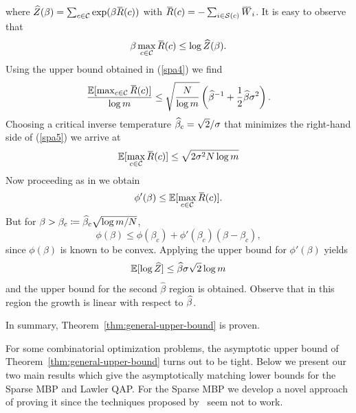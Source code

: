 where $\hat{Z}(\beta)=\sum_{c \in \C} \exp(\beta \bar{R}(c))$ with
$\bar{R}(c)=-\sum_{i \in \S(c)} \bar{W}_i$.  It is easy to observe
that
\begin{equation}
\beta \max_{c\in \C} \bar{R}(c) \leq \log \hat{Z}(\beta).
\end{equation}
Using the upper bound obtained in (\ref{spa4}) we  find
\begin{equation}
\label{spa5}
\frac{\Expct[\max_{c\in \C} \bar{R}(c)]}{\log m} \leq  \sqrt{\frac{N}{\log 
    m}} \left( {\hb}^{-1}+\frac 12 \hb \sigma^2 \right). 
\end{equation}
Choosing a critical inverse temperature $\hb_c=\sqrt{2}/\sigma$ 
that minimizes the right-hand side of (\ref{spa5}) we arrive at
\begin{equation}
  \Expct[\max_{c\in \C} \bar{R}(c)] \leq \sqrt{2\sigma^2 N \log m} 
\end{equation}
Now proceeding as in \citet[Proposition~1.1.3]{talagrand03}
we obtain
\begin{equation}
\phi'(\beta) \leq \Expct[\max_{c\in \C} \bar{R}(c)].
\end{equation}
But for $\beta > \beta_c \coloneqq \hb_c\sqrt{\log m / N}$,
\begin{equation}
    \phi(\beta)
    \leq \phi(\beta_c) + \phi'(\beta_c)(\beta - \beta_c),
\end{equation}
%
since $\phi(\beta)$ is known to be convex.  Applying the
upper bound for $\phi'(\beta)$ yields 
\begin{equation}\label{second_upper}
\Expct[\log \hat Z] \leq \hb \sigma \sqrt{2} \log m
\end{equation}
and the upper bound for the second $\hat\beta$ region is obtained.
Observe that in this region the growth is linear with respect to $\hb$. 

In summary, Theorem~\ref{thm:general-upper-bound} is proven. \QEDA


For some combinatorial optimization problems, the asymptotic upper bound of
Theorem~\ref{thm:general-upper-bound} turns out to be tight. Below we present
our two main results which give the asymptotically matching lower bounds for the
Sparse MBP and Lawler QAP. For the Sparse MBP we develop a novel approach of
proving it since the techniques  proposed by~\citet[][Chapter 1]{talagrand03}
seem not to work.%

